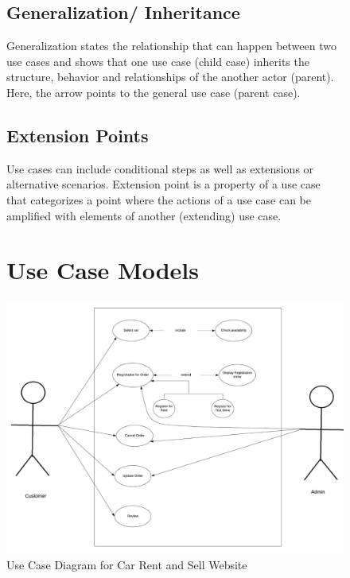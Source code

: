 \begin{figure}

\noindent 
\subsection{Generalization/ Inheritance}

\noindent Generalization states the relationship that can happen between two use cases and shows that one use case (child case) inherits the structure, behavior and relationships of the another actor (parent). Here, the arrow points to the general use case (parent case).


\noindent 
\subsection*{Extension Points}

\noindent Use cases can include conditional steps as well as extensions or alternative scenarios. Extension point is a property of a use case that categorizes a point where the actions of a use case can be amplified with elements of another (extending) use case.



\noindent 


\section{Use Case Models}


\noindent \includegraphics*[width=5.51in, height=4 in]{figures/use}

\caption{Use Case Diagram for Car Rent and Sell Website}



\end{figure}
